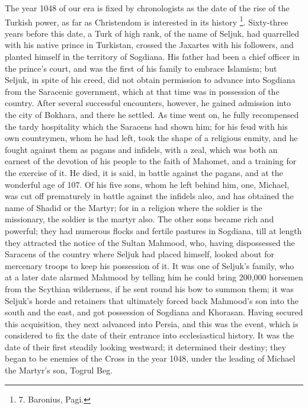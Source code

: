 The year 1048 of our era is
fixed by chronologists as the date of the rise of the Turkish power,
as far as Christendom is interested in its history \footnote{7.
Baronius, Pagi.}. Sixty-three years before this date, a Turk of high rank, of
the name of Seljuk, had quarrelled with his native prince in Turkistan,
crossed the Jaxartes with his followers, and planted himself in the
territory of Sogdiana. His father had been a chief officer in the
prince's court, and was the first of his family to embrace Islamism;
but Seljuk, in spite of his creed, did not obtain permission to
advance into Sogdiana from the Saracenic government, which at that
time was in possession of the country. After several successful
encounters, however, he gained admission into the city of Bokhara, and
there he settled. As time went on, he fully recompensed the tardy
hospitality which the Saracens had shown him; for his feud with
his own countrymen, whom he had left, took the shape of a religious
enmity, and he fought against them as pagans and infidels, with a
zeal, which was both an earnest of the devotion of his people to the
faith of Mahomet, and a training for the exercise of it. He died, it
is said, in battle against the pagans, and at the wonderful age of
107. Of his five sons, whom he left behind him, one, Michael, was cut
off prematurely in battle against the infidels also, and has obtained
the name of Shadid or the Martyr; for in a religion where the soldier
is the missionary, the soldier is the martyr also. The other sons
became rich and powerful; they had numerous flocks and fertile
pastures in Sogdiana, till at length they attracted the notice of the
Sultan Mahmood, who, having dispossessed the Saracens of the country
where Seljuk had placed himself, looked about for mercenary troops to
keep his possession of it. It was one of Seljuk's family, who at a
later date alarmed Mahmood by telling him he could bring 200,000
horsemen from the Scythian wilderness, if he sent round his bow to
summon them; it was Seljuk's horde and retainers that ultimately
forced back Mahmood's son into the south and the east, and got
possession of Sogdiana and Khorasan. Having secured this acquisition,
they next advanced into Persia, and this was the event, which is
considered to fix the date of their entrance into ecclesiastical
history. It was the date of their first steadily looking westward; it
determined their destiny; they began to be enemies of the Cross in the
year 1048, under the leading of Michael the Martyr's son, Togrul Beg.

